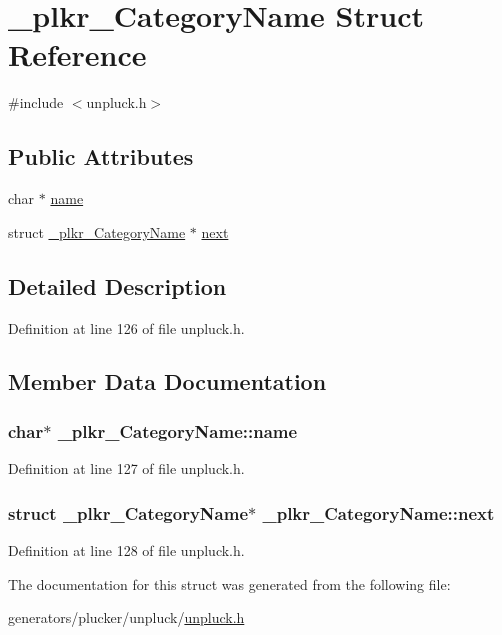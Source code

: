 \hypertarget{struct__plkr__CategoryName}{\section{\+\_\+plkr\+\_\+\+Category\+Name Struct Reference}
\label{struct__plkr__CategoryName}
}


{\ttfamily \#include $<$unpluck.\+h$>$}

\subsection*{Public Attributes}
\begin{DoxyCompactItemize}
\item 
char $\ast$ \hyperlink{struct__plkr__CategoryName_acfd66167de9ffdbf9abf5e889479d1d4}{name}
\item 
struct \hyperlink{struct__plkr__CategoryName}{\+\_\+plkr\+\_\+\+Category\+Name} $\ast$ \hyperlink{struct__plkr__CategoryName_aeb66d543bca1c4d6f0c13d095cabd47a}{next}
\end{DoxyCompactItemize}


\subsection{Detailed Description}


Definition at line 126 of file unpluck.\+h.



\subsection{Member Data Documentation}
\hypertarget{struct__plkr__CategoryName_acfd66167de9ffdbf9abf5e889479d1d4}{
\subsubsection[{name}]{\setlength{\rightskip}{0pt plus 5cm}char$\ast$ \+\_\+plkr\+\_\+\+Category\+Name\+::name}}\label{struct__plkr__CategoryName_acfd66167de9ffdbf9abf5e889479d1d4}


Definition at line 127 of file unpluck.\+h.

\hypertarget{struct__plkr__CategoryName_aeb66d543bca1c4d6f0c13d095cabd47a}{
\subsubsection[{next}]{\setlength{\rightskip}{0pt plus 5cm}struct {\bf \+\_\+plkr\+\_\+\+Category\+Name}$\ast$ \+\_\+plkr\+\_\+\+Category\+Name\+::next}}\label{struct__plkr__CategoryName_aeb66d543bca1c4d6f0c13d095cabd47a}


Definition at line 128 of file unpluck.\+h.



The documentation for this struct was generated from the following file\+:\begin{DoxyCompactItemize}
\item 
generators/plucker/unpluck/\hyperlink{unpluck_8h}{unpluck.\+h}\end{DoxyCompactItemize}
